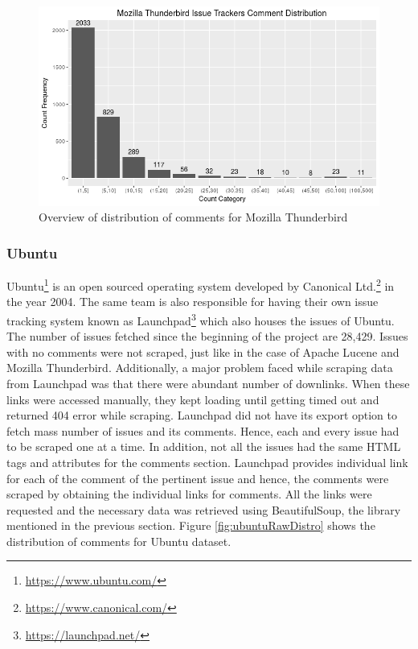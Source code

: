 \documentclass[a4paper,12pt,twoside]{report}
\begin{document}
\begin{figure}[h] %
    \centering
    \includegraphics[width=14cm]{thunderbird-comment-distribution-raw}
    \caption{Overview of distribution of comments for Mozilla Thunderbird}
    \label{fig:thunderbirdRawDistro}
\end{figure}

\subsubsection{Ubuntu}
Ubuntu\footnote{\url{https://www.ubuntu.com/}} is an open sourced operating system developed by Canonical Ltd.\footnote{\url{https://www.canonical.com/}} in the year 2004. The same team is also responsible for having their own issue tracking system known as Launchpad\footnote{\url{https://launchpad.net/}} which also houses the issues of Ubuntu. The number of issues fetched since the beginning of the project are 28,429. Issues with no comments were not scraped, just like in the case of Apache Lucene and Mozilla Thunderbird. Additionally, a major problem faced while scraping data from Launchpad was that there were abundant number of downlinks. When these links were accessed manually, they kept loading until getting timed out and returned 404 error while scraping.
\bigbreak
Launchpad did not have its export option to fetch mass number of issues and its comments. Hence, each and every issue had to be scraped one at a time. In addition, not all the issues had the same HTML tags and attributes for the comments section. Launchpad provides individual link for each of the comment of the pertinent issue and hence, the comments were scraped by obtaining the individual links for comments. All the links were requested and the necessary data was retrieved using BeautifulSoup, the library mentioned in the previous section. Figure \ref{fig:ubuntuRawDistro} shows the distribution of comments for Ubuntu dataset. 
\end{document}

